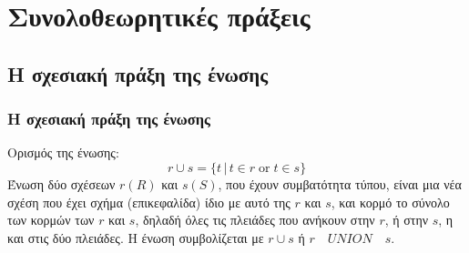 
\section[\textlatin{Sets}]{\textgreek{Συνολοθεωρητικές πράξεις}}

\subsection[{\en Union}]{\textgreek{Η σχεσιακή πράξη της ένωσης}}


\begin{frame}
\frametitle{Η σχεσιακή πράξη της ένωσης}
\begin{minipage}{\wE}
\large
\begin{block}{Ορισμός της ένωσης:}
  \[
     r \cup s = \{t \,|\, t \in r \; \mathrm{or} \; t \in s \}
  \]
  {\bb Ένωση} δύο σχέσεων $r(R)$ και $s(S)$, που έχουν συμβατότητα τύπου, είναι μια νέα σχέση
  που έχει σχήμα (επικεφαλίδα) ίδιο με αυτό της $r$ και $s$, και κορμό το σύνολο
  των κορμών των $r$ και $s$, δηλαδή όλες τις πλειάδες που ανήκουν στην $r$, ή στην $s$,
  η και στις δύο πλειάδες.
  Η ένωση συμβολίζεται με $r \cup s$  ή $r \quad UNION \quad s$.
\end{block}
\end{minipage}
\end{frame}


